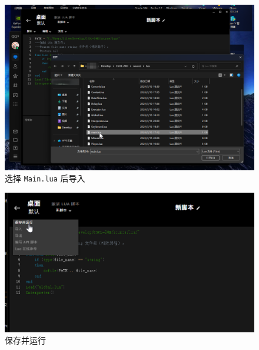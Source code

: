 \begin{figure}[H]
    \Centering
    \includegraphics[width=\textwidth]{docs/assets/intro/main.png}
    \caption{选择 \lstinline{Main.lua} 后导入}
    \label{ch0fig-import-main-lua}
\end{figure}

\begin{figure}[H]
    \Centering
    \includegraphics[width=\textwidth]{docs/assets/intro/save_and_run.png}
    \caption{保存并运行}
    \label{ch0fig-save-and-run}
\end{figure}



